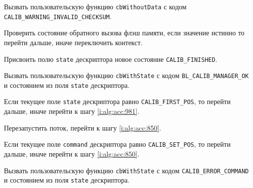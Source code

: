 \begin{enumerate_step}
    \item Вызвать пользовательскую функцию \lstinline|cbWithoutData| с кодом \lstinline|CALIB_WARNING_INVALID_CHECKSUM|.
    \item \label{i:alg:acc:953} Проверить состояние обратного вызова флэш памяти, если значение истинно то перейти дальше, иначе переключить контекст.
    \item Присвоить полю \lstinline|state| дескриптора новое состояние \lstinline|CALIB_FINISHED|.
    \item Вызвать пользовательскую функцию \lstinline|cbWithState| с кодом \lstinline|BL_CALIB_MANAGER_OK| и состоянием из поля \lstinline|state| дескриптора.

    \item \label{i:alg:acc:973} Если текущее поле \lstinline|state| дескриптора равно \lstinline|CALIB_FIRST_POS|, то перейти дальше, иначе перейти к шагу
    \ref{i:alg:acc:981}.
    \item Перезапустить поток, перейти к шагу \ref{i:alg:acc:850}.
    \item \label{i:alg:acc:981} Если текущее поле \lstinline|command| дескриптора равно \lstinline|CALIB_SET_POS|, то перейти дальше, иначе перейти к шагу
    \ref{i:alg:acc:850}.
    \item Вызвать пользовательскую функцию \lstinline|cbWithState| с кодом \lstinline|CALIB_ERROR_COMMAND| и состоянием из поля \lstinline|state| дескриптора.


\end{enumerate_step}
